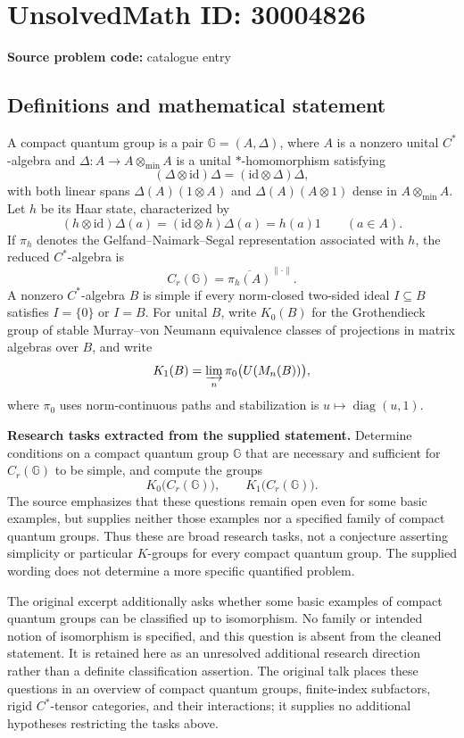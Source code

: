 \documentclass[11pt]{article}
\begin{document}
\section*{UnsolvedMath ID: 30004826}
\textbf{Source problem code:} catalogue entry
\subsection{Definitions and mathematical statement}
A compact quantum group is a pair \(\mathbb G=(A,\Delta)\), where \(A\) is a nonzero unital \(C^*\)-algebra and \(\Delta:A\to A\otimes_{\min}A\) is a unital \(*\)-homomorphism satisfying
\[
(\Delta\otimes\mathrm{id})\Delta=(\mathrm{id}\otimes\Delta)\Delta,
\]
with both linear spans \(\Delta(A)(1\otimes A)\) and \(\Delta(A)(A\otimes1)\) dense in \(A\otimes_{\min}A\). Let \(h\) be its Haar state, characterized by
\[
(h\otimes\mathrm{id})\Delta(a)=(\mathrm{id}\otimes h)\Delta(a)=h(a)1\qquad(a\in A).
\]
If \(\pi_h\) denotes the Gelfand--Naimark--Segal representation associated with \(h\), the reduced \(C^*\)-algebra is
\[
C_r(\mathbb G)=\overline{\pi_h(A)}^{\|\cdot\|}.
\]
A nonzero \(C^*\)-algebra \(B\) is simple if every norm-closed two-sided ideal \(I\subseteq B\) satisfies \(I=\{0\}\) or \(I=B\). For unital \(B\), write \(K_0(B)\) for the Grothendieck group of stable Murray--von Neumann equivalence classes of projections in matrix algebras over \(B\), and write
\[
K_1(B)=\varinjlim_n\pi_0\bigl(U(M_n(B))\bigr),
\]
where \(\pi_0\) uses norm-continuous paths and stabilization is \(u\mapsto\operatorname{diag}(u,1)\).

\textbf{Research tasks extracted from the supplied statement.} Determine conditions on a compact quantum group \(\mathbb G\) that are necessary and sufficient for \(C_r(\mathbb G)\) to be simple, and compute the groups
\[
K_0\bigl(C_r(\mathbb G)\bigr),\qquad K_1\bigl(C_r(\mathbb G)\bigr).
\]
The source emphasizes that these questions remain open even for some basic examples, but supplies neither those examples nor a specified family of compact quantum groups. Thus these are broad research tasks, not a conjecture asserting simplicity or particular \(K\)-groups for every compact quantum group. The supplied wording does not determine a more specific quantified problem.

The original excerpt additionally asks whether some basic examples of compact quantum groups can be classified up to isomorphism. No family or intended notion of isomorphism is specified, and this question is absent from the cleaned statement. It is retained here as an unresolved additional research direction rather than a definite classification assertion. The original talk places these questions in an overview of compact quantum groups, finite-index subfactors, rigid \(C^*\)-tensor categories, and their interactions; it supplies no additional hypotheses restricting the tasks above.
\end{document}
